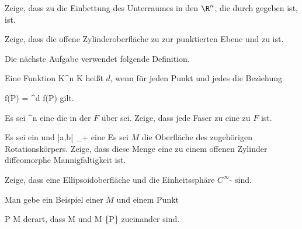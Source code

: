 {}
{

Zeige, dass zu
 die Einbettung des Unterraumes
 in den $\R^n$, die durch
 gegeben ist,
 ist.

}
{} {}

{}
{

Zeige, dass die offene Zylinderoberfläche
\mathl{S^1 \times {]0,1[}}{} zu
 zur punktierten Ebene
 und zu
ist.

}
{} {}

Die nächste Aufgabe verwendet folgende Definition.

Eine Funktion
 { {\mathbb K}^n } { {\mathbb K}
} {}
heißt
$d$, wenn für jeden Punkt
 und jedes
 die Beziehung

\mavergleichskettedisp
{\vergleichskette
{f(\lambda P)
}
{ =} { \lambda^d f(P)
}
{ } {
}
{ } {
}
{ } {
}
}
{}{}{}
gilt.

{}
{

Es sei
 {\R^n } {\R
} {}
eine
 
die in der
$F$ über
sei. Zeige, dass jede Faser zu
 eine zu $F$
 
ist.

}
{} {}

{}
{

Es sei
\mathl{]a,b[}{} ein
und
 {]a,b[} {\R_{+}
} {}
eine
Es sei $M$ die Oberfläche des zugehörigen Rotationskörpers. Zeige, dass diese Menge eine zu einem offenen Zylinder diffeomorphe Mannigfaltigkeit ist.

}
{} {}

{}
{

Zeige, dass eine Ellipsoidoberfläche und die Einheitssphäre
$C^\infty$- sind.

}
{} {}

{}
{

Man gebe ein Beispiel einer
 
$M$ und einem Punkt

\mavergleichskette
{\vergleichskette
{ P
}
{ \in }{ M
}
{  }{
}
{    }{
}
{   }{
}
}
{}{}{}
derart, dass
\mathkor {} {M} {und} {M \setminus \{P\}} {}
zueinander
sind.

}
{} {}

